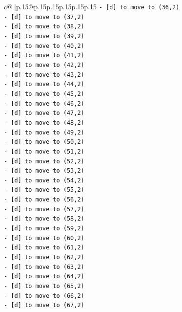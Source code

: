 \documentclass{article}
\begin{document}
{\begin{supertabular}{c@{$\;$}|p{.15\linewidth}@{}p{.15\linewidth}p{.15\linewidth}p{.15\linewidth}p{.15\linewidth}p{.15\linewidth}}
{{{\texttt{{-} {[}d{]} to move to (36,2)} \\
\texttt{{-} {[}d{]} to move to (37,2)} \\
\texttt{{-} {[}d{]} to move to (38,2)} \\
\texttt{{-} {[}d{]} to move to (39,2)} \\
\texttt{{-} {[}d{]} to move to (40,2)} \\
\texttt{{-} {[}d{]} to move to (41,2)} \\
\texttt{{-} {[}d{]} to move to (42,2)} \\
\texttt{{-} {[}d{]} to move to (43,2)} \\
\texttt{{-} {[}d{]} to move to (44,2)} \\
\texttt{{-} {[}d{]} to move to (45,2)} \\
\texttt{{-} {[}d{]} to move to (46,2)} \\
\texttt{{-} {[}d{]} to move to (47,2)} \\
\texttt{{-} {[}d{]} to move to (48,2)} \\
\texttt{{-} {[}d{]} to move to (49,2)} \\
\texttt{{-} {[}d{]} to move to (50,2)} \\
\texttt{{-} {[}d{]} to move to (51,2)} \\
\texttt{{-} {[}d{]} to move to (52,2)} \\
\texttt{{-} {[}d{]} to move to (53,2)} \\
\texttt{{-} {[}d{]} to move to (54,2)} \\
\texttt{{-} {[}d{]} to move to (55,2)} \\
\texttt{{-} {[}d{]} to move to (56,2)} \\
\texttt{{-} {[}d{]} to move to (57,2)} \\
\texttt{{-} {[}d{]} to move to (58,2)} \\
\texttt{{-} {[}d{]} to move to (59,2)} \\
\texttt{{-} {[}d{]} to move to (60,2)} \\
\texttt{{-} {[}d{]} to move to (61,2)} \\
\texttt{{-} {[}d{]} to move to (62,2)} \\
\texttt{{-} {[}d{]} to move to (63,2)} \\
\texttt{{-} {[}d{]} to move to (64,2)} \\
\texttt{{-} {[}d{]} to move to (65,2)} \\
\texttt{{-} {[}d{]} to move to (66,2)} \\
\texttt{{-} {[}d{]} to move to (67,2)} \\
}}}
\end{supertabular}}
\end{document}
